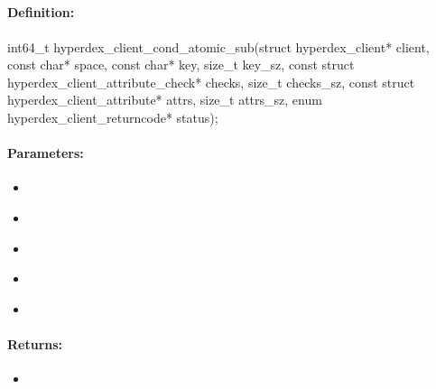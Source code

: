\pagebreak
\subsection{}
\label{api:c:cond_atomic_sub}


\paragraph{Definition:}
\begin{ccode}
int64_t hyperdex_client_cond_atomic_sub(struct hyperdex_client* client,
        const char* space,
        const char* key, size_t key_sz,
        const struct hyperdex_client_attribute_check* checks, size_t checks_sz,
        const struct hyperdex_client_attribute* attrs, size_t attrs_sz,
        enum hyperdex_client_returncode* status);
\end{ccode}

\paragraph{Parameters:}
\begin{itemize}[noitemsep]
\item {}\\

\item {}\\

\item {}\\

\item {}\\

\item {}\\

\end{itemize}

\paragraph{Returns:}
\begin{itemize}[noitemsep]
\item {}\\

\end{itemize}

